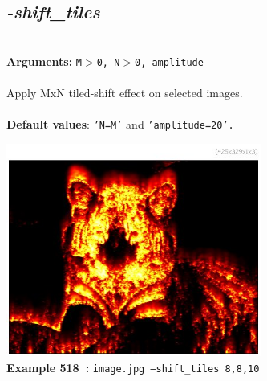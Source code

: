 \documentclass[a4paper,11pt,twoside]{book}
\begin{document}
\subsection{\emph{-shift\_tiles} }\vspace*{-0.5em}
~\\\textbf{Arguments: } 
{\small \texttt{M$>$0,\_N$>$0,\_amplitude}}\\~\\
Apply MxN tiled-shift effect on selected images.
~\\~\\\textbf{Default values}: {\small \texttt{'N=M'} and \texttt{'amplitude=20'.}}
\begin{center}\includegraphics[keepaspectratio=true,height=7cm,width=\textwidth]{img/gmic_def518.jpg}\\
{\footnotesize \textbf{Example 518~:} \texttt{image.jpg --shift\_tiles 8,8,10}}
\end{center}
\end{document}

